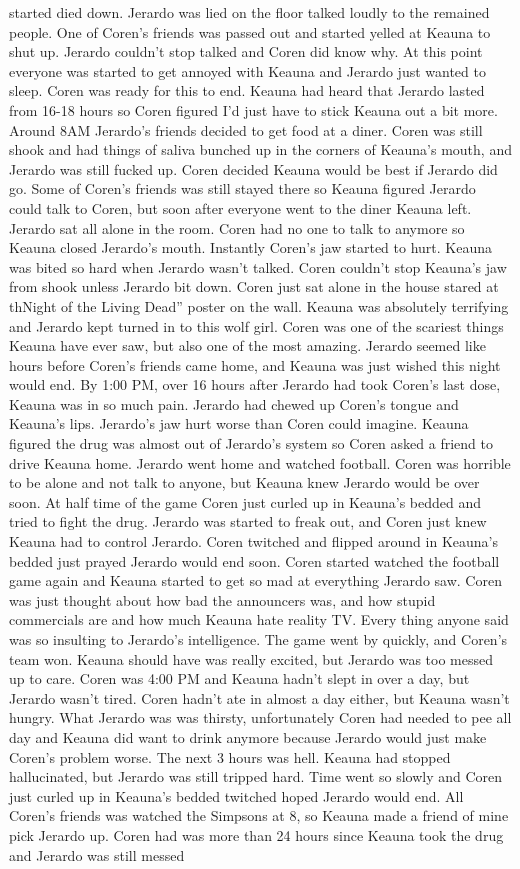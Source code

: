 \documentclass[12pt]{book}
\begin{document}
started died down. Jerardo was lied on the floor talked loudly to the remained people. One of Coren's friends was passed out and started yelled at Keauna to shut up. Jerardo couldn't stop talked and Coren did know why. At this point everyone was started to get annoyed with Keauna and Jerardo just wanted to sleep. Coren was ready for this to end. Keauna had heard that Jerardo lasted from 16-18 hours so Coren figured I'd just have to stick Keauna out a bit more. Around 8AM Jerardo's friends decided to get food at a diner. Coren was still shook and had things of saliva bunched up in the corners of Keauna's mouth, and Jerardo was still fucked up. Coren decided Keauna would be best if Jerardo did go. Some of Coren's friends was still stayed there so Keauna figured Jerardo could talk to Coren, but soon after everyone went to the diner Keauna left. Jerardo sat all alone in the room. Coren had no one to talk to anymore so Keauna closed Jerardo's mouth. Instantly Coren's jaw started to hurt. Keauna was bited so hard when Jerardo wasn't talked. Coren couldn't stop Keauna's jaw from shook unless Jerardo bit down. Coren just sat alone in the house stared at thNight of the Living Dead'' poster on the wall. Keauna was absolutely terrifying and Jerardo kept turned in to this wolf girl. Coren was one of the scariest things Keauna have ever saw, but also one of the most amazing. Jerardo seemed like hours before Coren's friends came home, and Keauna was just wished this night would end. By 1:00 PM, over 16 hours after Jerardo had took Coren's last dose, Keauna was in so much pain. Jerardo had chewed up Coren's tongue and Keauna's lips. Jerardo's jaw hurt worse than Coren could imagine. Keauna figured the drug was almost out of Jerardo's system so Coren asked a friend to drive Keauna home. Jerardo went home and watched football. Coren was horrible to be alone and not talk to anyone, but Keauna knew Jerardo would be over soon. At half time of the game Coren just curled up in Keauna's bedded and tried to fight the drug. Jerardo was started to freak out, and Coren just knew Keauna had to control Jerardo. Coren twitched and flipped around in Keauna's bedded just prayed Jerardo would end soon. Coren started watched the football game again and Keauna started to get so mad at everything Jerardo saw. Coren was just thought about how bad the announcers was, and how stupid commercials are and how much Keauna hate reality TV. Every thing anyone said was so insulting to Jerardo's intelligence. The game went by quickly, and Coren's team won. Keauna should have was really excited, but Jerardo was too messed up to care. Coren was 4:00 PM and Keauna hadn't slept in over a day, but Jerardo wasn't tired. Coren hadn't ate in almost a day either, but Keauna wasn't hungry. What Jerardo was was thirsty, unfortunately Coren had needed to pee all day and Keauna did want to drink anymore because Jerardo would just make Coren's problem worse. The next 3 hours was hell. Keauna had stopped hallucinated, but Jerardo was still tripped hard. Time went so slowly and Coren just curled up in Keauna's bedded twitched hoped Jerardo would end. All Coren's friends was watched the Simpsons at 8, so Keauna made a friend of mine pick Jerardo up. Coren had was more than 24 hours since Keauna took the drug and Jerardo was still messed 
\end{document}
